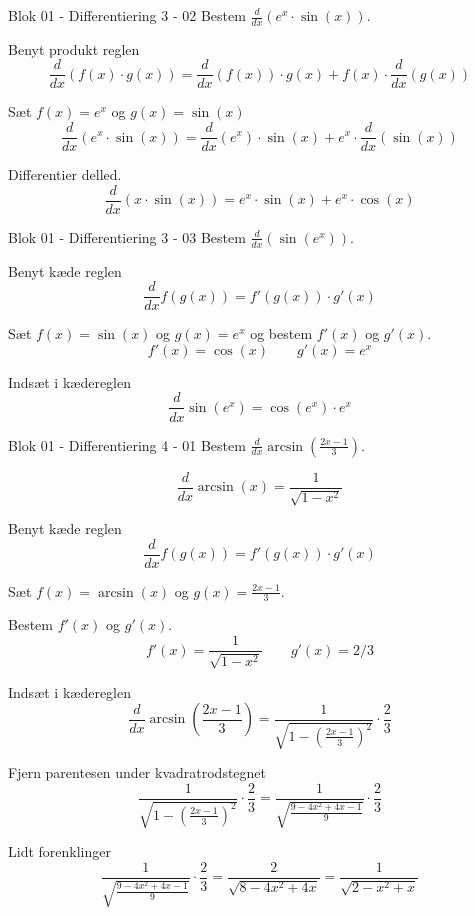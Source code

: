 \documentclass{article}
\begin{document}
\begin{exercise}{Blok 01 - Differentiering 3 - 02}
Bestem $\frac{d}{dx} \left( e^x \cdot \sin(x) \right)$.


\hint
Benyt produkt reglen
\[
\frac{d}{dx} \left( f(x) \cdot g(x) \right) = \frac{d}{dx} \left( f(x) \right) \cdot g(x) + f(x) \cdot \frac{d}{dx} \left( g(x) \right)
\]

\hint
Sæt $f(x) = e^x$ og $g(x) = \sin(x)$
\[
\frac{d}{dx} \left( e^x \cdot \sin(x) \right) = \frac{d}{dx} \left( e^x \right) \cdot \sin(x) + e^x \cdot \frac{d}{dx} \left( \sin(x) \right)
\]

\hint
Differentier delled.
\[
\frac{d}{dx} \left( x \cdot \sin(x) \right) = e^x \cdot \sin(x) + e^x \cdot \cos(x)
\]
\end{exercise}



\begin{exercise}{Blok 01 - Differentiering 3 - 03}
Bestem $\frac{d}{dx} \left( \sin(e^x) \right)$.


\hint
Benyt kæde reglen
\[
\frac{d}{dx} f(g(x)) = f'(g(x)) \cdot g'(x)
\]

\hint
Sæt $f(x) = \sin(x)$ og $g(x) = e^x$ og bestem $f'(x)$ og $g'(x)$.
\[
f'(x) = \cos(x) \qquad g'(x) = e^x
\]

\hint
Indsæt i kædereglen
\[
\frac{d}{dx} \sin(e^x) = \cos(e^x) \cdot e^x
\]
\end{exercise}


\begin{exercise}{Blok 01 - Differentiering 4 - 01}
Bestem $\frac{d}{dx} \arcsin\left( \frac{2x-1}{3} \right)$.



\hint
\[
\frac{d}{dx} \arcsin(x) = \frac{1}{\sqrt{1 - x^ 2}}
\]


\hint
Benyt kæde reglen
\[
\frac{d}{dx} f(g(x)) = f'(g(x)) \cdot g'(x)
\]

\hint
Sæt $f(x) = \arcsin(x)$ og $g(x) = \frac{2x - 1}{3}$.

\hint
Bestem $f'(x)$ og $g'(x)$.
\[
f'(x) = \frac{1}{\sqrt{1 - x^ 2}} \qquad g'(x) = 2/3
\]

\hint
Indsæt i kædereglen
\[
\frac{d}{dx} \arcsin\left( \frac{2x-1}{3} \right) = \frac{1}{\sqrt{1 - \left( \frac{2x - 1}{3} \right)^ 2}} \cdot \frac{2}{3}
\]

\hint
Fjern parentesen under kvadratrodstegnet
\[
\frac{1}{\sqrt{1 - \left( \frac{2x - 1}{3} \right)^ 2}} \cdot \frac{2}{3}
= \frac{1}{\sqrt{\frac{9 - 4x^2 + 4x - 1}{9}}} \cdot \frac{2}{3}
\]

\hint
Lidt forenklinger
\[
\frac{1}{\sqrt{\frac{9 - 4x^2 + 4x - 1}{9}}} \cdot \frac{2}{3}
= \frac{2}{\sqrt{8 - 4x^2 + 4x}}
= \frac{1}{\sqrt{2 - x^2 + x}}
\]
\end{exercise}
\end{document}
